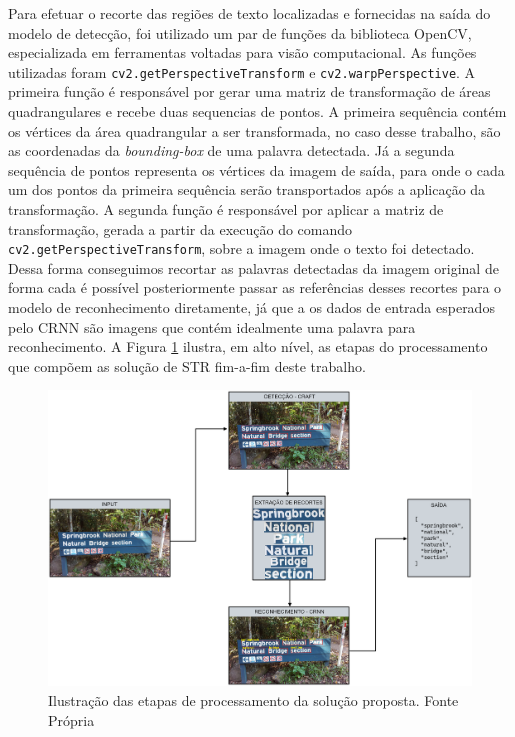 Para efetuar o recorte das regiões de texto localizadas e fornecidas na saída do modelo de detecção, foi utilizado um par de funções da biblioteca OpenCV, especializada em ferramentas voltadas para visão computacional. As funções utilizadas foram \texttt{cv2.getPerspectiveTransform} e \texttt{cv2.warpPerspective}.
A primeira função é responsável por gerar uma matriz de transformação de áreas quadrangulares e recebe duas sequencias de pontos. A primeira sequência contém os vértices da área quadrangular a ser transformada, no caso desse trabalho, são as coordenadas da \textit{bounding-box} de uma palavra detectada. Já a segunda sequência de pontos representa os vértices da imagem de saída, para onde o cada um dos pontos da primeira sequência serão transportados após a aplicação da transformação.
A segunda função é responsável por aplicar a matriz de transformação, gerada a partir da execução do comando \texttt{cv2.getPerspectiveTransform}, sobre a imagem onde o texto foi detectado. Dessa forma conseguimos recortar as palavras detectadas da imagem original de forma cada é possível posteriormente passar as referências desses recortes para o modelo de reconhecimento diretamente, já que a os dados de entrada esperados pelo CRNN são imagens que contém idealmente uma palavra para reconhecimento. A Figura \ref{fig:methodology_pipeline} ilustra, em alto nível, as etapas do processamento que compõem as solução de STR fim-a-fim deste trabalho.

\begin{figure}
    \centering
    \includegraphics[width=\textwidth]{figs/metodologia-pipeline.png}
    \caption{Ilustração das etapas de processamento da solução proposta. Fonte Própria}
    \label{fig:methodology_pipeline}
\end{figure}

